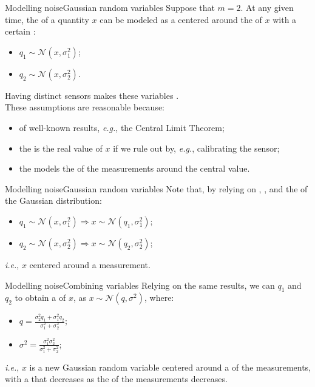 \begin{frame}{Modelling noise}{Gaussian random variables}
  Suppose that $m=2$. At any given time, the  of a quantity $x$ can be modeled as a  centered around the  of $x$ with a certain :
  \begin{itemize}
    \item $q_1 \sim \mathcal{N}(x,\sigma_1^2)$;
    \item $q_2 \sim \mathcal{N}(x,\sigma_2^2)$.
  \end{itemize}
  Having distinct sensors makes these variables .\\
  These assumptions are reasonable because:
  \begin{itemize}
    \item of well-known results, \emph{e.g.}, the Central Limit Theorem;
    \item the  is the real value of $x$ if we rule out  by, \emph{e.g.}, calibrating the sensor;
    \item the  models the  of the measurements around the central value.
  \end{itemize}
\end{frame}
\begin{frame}{Modelling noise}{Gaussian random variables}
  Note that, by relying on , , and the  of the Gaussian distribution:
  \begin{itemize}
    \item $q_1 \sim \mathcal{N}(x,\sigma_1^2) \Rightarrow x \sim \mathcal{N}(q_1,\sigma_1^2)$;
    \item $q_2 \sim \mathcal{N}(x,\sigma_2^2) \Rightarrow x \sim \mathcal{N}(q_2,\sigma_2^2)$;
  \end{itemize}
  \emph{i.e.}, $x$  centered around a measurement.
\end{frame}
\begin{frame}{Modelling noise}{Combining variables}
  Relying on the same results, we can  $q_1$ and $q_2$ to obtain a  of $x$, as $x \sim \mathcal{N}(q,\sigma^2)$, where:
  \begin{itemize}
    \item $q = \frac{\sigma_2^2 q_1 + \sigma_1^2 q_2}{\sigma_1^2 + \sigma_2^2}$;
    \item $\sigma^2 = \frac{\sigma_1^2 \sigma_2^2}{\sigma_1^2 + \sigma_2^2}$;
  \end{itemize}
  \emph{i.e.}, $x$ is a new Gaussian random variable centered around a  of the measurements, with a  that decreases as the  of the measurements decreases.
\end{frame}

